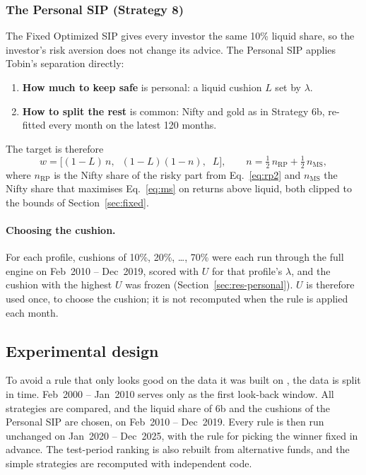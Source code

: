 \subsubsection{The Personal SIP (Strategy 8)}
\label{sec:personal}

The Fixed Optimized SIP gives every investor the same 10\% liquid share, so the investor's risk
aversion does not change its advice. The Personal SIP applies Tobin's separation directly:
\begin{enumerate}
  \item \textbf{How much to keep safe} is personal: a liquid cushion $L$ set by $\lambda$.
  \item \textbf{How to split the rest} is common: Nifty and gold as in Strategy 6b, re-fitted every
        month on the latest 120 months.
\end{enumerate}
The target is therefore
\begin{equation}
  w = \Big[(1-L)\,n,\;\; (1-L)(1-n),\;\; L\Big], \qquad
  n = \tfrac12\, n_{\text{RP}} + \tfrac12\, n_{\text{MS}} ,
  \label{eq:personal}
\end{equation}
where $n_{\text{RP}}$ is the Nifty share of the risky part from Eq.~\eqref{eq:rp2} and $n_{\text{MS}}$
the Nifty share that maximises Eq.~\eqref{eq:ms} on returns above liquid, both clipped to the bounds
of Section~\ref{sec:fixed}.

\paragraph{Choosing the cushion.} For each profile, cushions of 10\%, 20\%, \dots, 70\% were each run
through the full engine on Feb~2010 -- Dec~2019, scored with $U$ for that profile's $\lambda$, and
the cushion with the highest $U$ was frozen (Section~\ref{sec:res-personal}). $U$ is therefore used
once, to choose the cushion; it is not recomputed when the rule is applied each month.

\subsection{Experimental design}
\label{sec:design}

To avoid a rule that only looks good on the data it was built on \citep{bailey2014}, the data is
split in time. Feb~2000 -- Jan~2010 serves only as the first look-back window. All strategies are
compared, and the liquid share of 6b and the cushions of the Personal SIP are chosen, on
Feb~2010 -- Dec~2019. Every rule is then run unchanged on Jan~2020 -- Dec~2025, with the rule for
picking the winner fixed in advance. The test-period ranking is also rebuilt from alternative funds,
and the simple strategies are recomputed with independent code.

